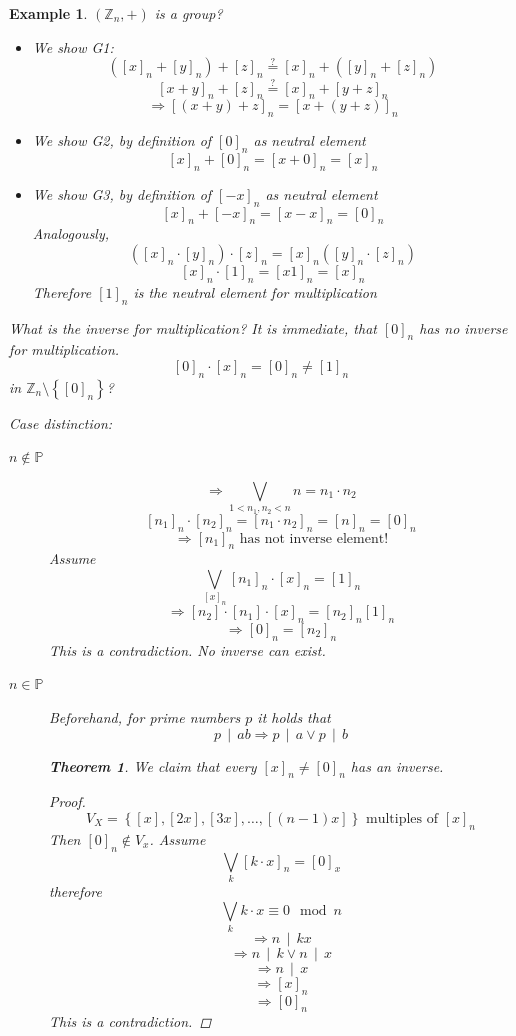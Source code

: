 \documentclass[a4paper,landscape,twocolumn]{article}
\newcommand\set[1]{\left\{#1\right\}}
\newcommand\divides[2]{#1\,\mid\,#2}
\newtheorem{theorem}{Theorem}
\newtheorem{ex}{Example}
\begin{document}
\begin{ex}
  $(\mathbb{Z}_n, +)$ is a group?
  \begin{itemize}
    \item We show G1:
      \[ \left([x]_n + [y]_n\right) + [z]_n \stackrel?= [x]_n + \left([y]_n + [z]_n\right) \]
      \[ [x+y]_n + [z]_n \stackrel?= [x]_n + \left[y + z\right]_n \]
      \[ \Rightarrow \left[(x + y) + z\right]_n = \left[x + (y + z)\right]_n \]
    \item We show G2, by definition of $[0]_n$ as neutral element
      \[ [x]_n + [0]_n = [x + 0]_n = [x]_n \]
    \item We show G3, by definition of $[-x]_n$ as neutral element
      \[ [x]_n + [-x]_n = [x - x]_n = [0]_n \]
      Analogously,
      \[ \left([x]_n \cdot [y]_n\right) \cdot [z]_n = [x]_n \left([y]_n \cdot [z]_n\right) \]
      \[ [x]_n \cdot [1]_n = [x1]_n = [x]_n \]
      Therefore $[1]_n$ is the neutral element for multiplication
  \end{itemize}

  What is the inverse for multiplication?
  It is immediate, that $[0]_n$ has no inverse for multiplication.
  \[ [0]_n \cdot [x]_n = [0]_n \neq [1]_n \]
  in $\mathbb{Z}_n\setminus \set{[0]_n}$?

  Case distinction:
  \begin{description}
    \item[$n \not\in \mathbb{P}$]
      \[ \Rightarrow \bigvee_{1 < n_1, n_2 < n} n = n_1 \cdot n_2 \]
      \[ [n_1]_n \cdot [n_2]_n = [n_1 \cdot n_2]_n = [n]_n = [0]_n \]
      \[ \Rightarrow [n_1]_n \text{ has not inverse element!} \]
      Assume
      \[ \bigvee_{[x]_n} [n_1]_n \cdot [x]_n = [1]_n \]
      \[ \Rightarrow [n_2] \cdot [n_1] \cdot [x]_n = [n_2]_n [1]_n \]
      \[ \Rightarrow [0]_n = [n_2]_n \]
      This is a contradiction. No inverse can exist.
    \item[$n \in \mathbb{P}$]
      Beforehand, for prime numbers $p$ it holds that
      \[ \divides{p}{ab} \Rightarrow \divides{p}{a} \lor \divides{p}{b} \]

      \begin{theorem}
        We claim that every $[x]_n \neq [0]_n$ has an inverse.
      \end{theorem}
      \begin{proof}
        \[ V_X = \set{[x], [2x], [3x], \ldots, [(n-1) x]} \text{ multiples of } [x]_n \]
        Then $[0]_n \not\in V_x$. Assume
        \[ \bigvee_k [k\cdot x]_n = [0]_x \]
        therefore
        \[ \bigvee_k k \cdot x \equiv 0 \mod{n} \]
        \[ \Rightarrow \divides{n}{kx} \]
        \[ \Rightarrow \divides{n}{k} \lor \divides{n}{x} \]
        \[ \Rightarrow \divides{n}{x} \]
        \[ \Rightarrow [x]_n \]
        \[ \Rightarrow [0]_n \]
        This is a contradiction.
      \end{proof}


\end{description}
\end{ex}
\end{document}
